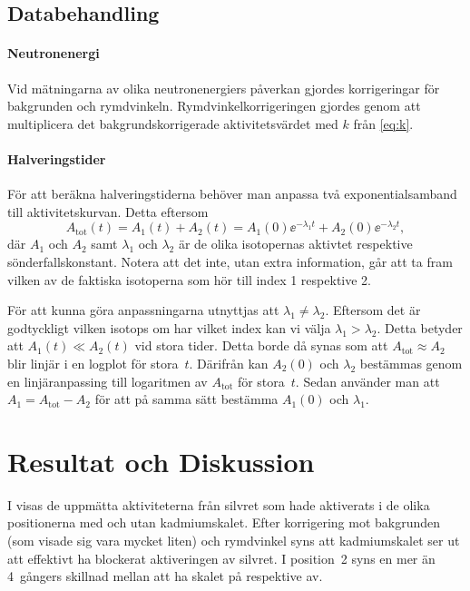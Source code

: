 \documentclass[11pt,a4paper, english, swedish
]{article}
\begin{document}
\subsection{Databehandling} \label{sec:databehandling}
\paragraph{Neutronenergi}
Vid mätningarna av olika neutronenergiers påverkan gjordes korrigeringar för bakgrunden och rymdvinkeln. Rymdvinkelkorrigeringen gjordes genom att multiplicera det bakgrundskorrigerade aktivitetsvärdet med $k$ från \eqref{eq:k}.

\paragraph{Halveringstider}
För att beräkna halveringstiderna behöver man anpassa två exponentialsamband till aktivitetskurvan. Detta eftersom 
\begin{equation}
A_\text{tot}(t) = A_{1}(t) + A_{2}(t) 
= A_{1}(0)\ee^{-\lambda_1 t} + A_{2}(0)\ee^{-\lambda_2 t},
\end{equation}
där $A_1$ och $A_2$ samt $\lambda_1$ och $\lambda_2$ är de olika isotopernas aktivtet respektive sönderfallskonstant. Notera att det inte, utan extra information, går att ta fram vilken av de faktiska isotoperna som hör till index 1 respektive 2. 

För att kunna göra anpassningarna utnyttjas att $\lambda_1\neq\lambda_2$. Eftersom det är godtyckligt vilken isotops om har vilket index kan vi välja $\lambda_1>\lambda_2$. Detta betyder att $A_{1}(t)\ll A_{2}(t)$ vid stora tider. Detta borde då synas som att $A_\text{tot}\approx A_2$ blir linjär i en logplot för stora~$t$. Därifrån kan $A_2(0)$ och $\lambda_2$ bestämmas genom en linjäranpassing till logaritmen av $A_\text{tot}$ för stora~$t$. 
Sedan använder man att $A_1=A_\text{tot}-A_2$ för att på samma sätt bestämma $A_1(0)$ och $\lambda_1$.



\section{Resultat och Diskussion}
I  visas de uppmätta aktiviteterna från silvret som hade aktiverats i de olika positionerna med och utan kadmiumskalet. Efter korrigering mot bakgrunden (som visade sig vara mycket liten) och rymdvinkel syns att kadmiumskalet ser ut att effektivt ha blockerat\footnotemark{} aktiveringen av silvret. I position~2 syns en mer än 4~gångers skillnad mellan att ha skalet på respektive av.
\end{document}
